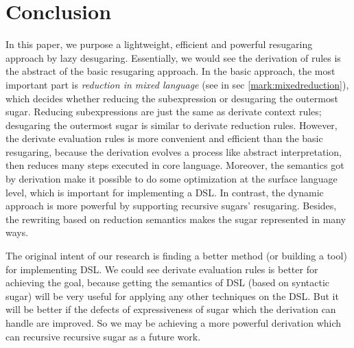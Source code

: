 \section{Conclusion}
\label{sec7}


In this paper, we purpose a lightweight, efficient and powerful resugaring approach by lazy desugaring. Essentially, we would see the derivation of rules is the abstract of the basic resugaring approach. In the basic approach, the most important part is \emph{reduction in mixed language} (see in sec \ref{mark:mixedreduction}), which decides whether reducing the subexpression or desugaring the outermost sugar. Reducing subexpressions are just the same as derivate context rules; desugaring the outermost sugar is similar to derivate reduction rules. However, the derivate evaluation rules is more convenient and efficient than the basic resugaring, because the derivation evolves a process like abstract interpretation\cite{AbstractInterpretation}, then reduces many steps executed in core language. Moreover, the semantics got by derivation make it possible to do some optimization at the surface language level, which is important for implementing a DSL. In contrast, the dynamic approach is more powerful by supporting recursive sugars' resugaring. Besides, the rewriting based on reduction semantics makes the sugar represented in many ways.

The original intent of our research is finding a better method (or building a tool) for implementing DSL. We could see derivate evaluation rules is better for achieving the goal, because getting the semantics of DSL (based on syntactic sugar) will be very useful for applying any other techniques on the DSL. But it will be better if the defects of expressiveness of sugar which the derivation can handle are improved. So we may be achieving a more powerful derivation which can recursive recursive sugar as a future work. 
